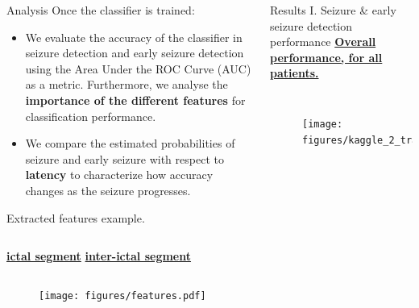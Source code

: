 \documentclass[final,t,overlay, xcolor=table, sans, mathserif]{beamer}
\begin{document}
\begin{frame}{}
\begin{columns}[t]
\begin{column}{.27\linewidth}
\begin{block}{Analysis}
Once the classifier is trained:
\begin{itemize}
\item[I.] We evaluate the accuracy of the classifier in seizure detection and early seizure detection using the
Area Under the ROC Curve (AUC) as a metric. Furthermore, we analyse the {\bf importance of the different features}
for classification performance.
\item[II.] We compare the estimated probabilities of seizure and early seizure with respect to {\bf latency} to characterize
how accuracy changes as the seizure progresses.
\end{itemize}
\end{block}

\vspace{-0.2cm}
\begin{block}{Extracted features example.}
\begin{columns}
\centering
{\bf \qquad \underline{ictal segment}}
\centering
{\bf \quad \underline{inter-ictal segment}}
\end{columns}
\begin{figure}
\texttt{[image: figures/features.pdf]}
\end{figure}
\end{block}

\end{column}
\begin{column}{.4\linewidth}

\begin{block}{Results I. Seizure \& early seizure detection performance}
\centering
\underline{\bf Overall performance, for all patients.}
\begin{columns}
\vspace{-1cm}
\begin{figure}
\texttt{[image: figures/kaggle\_2\_train\_test\_ROCseizure.pdf]}
\end{figure}
\vspace{-1cm}
\begin{figure}
\texttt{[image: figures/kaggle\_2\_train\_test\_ROCearly.pdf]}
\end{figure}
\end{columns}


\end{block}
\end{column}
\end{columns}
\end{frame}
\end{document}
